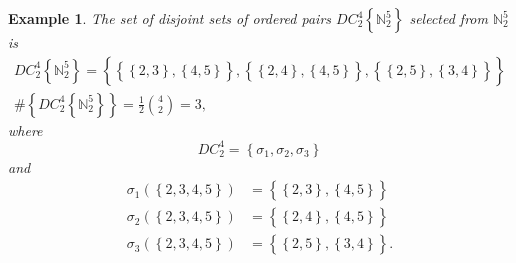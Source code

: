 \documentclass[aps,preprint]{revtex4}%
\newtheorem{example}[theorem]{Example}
\begin{document}
\begin{example}
The set of disjoint sets of ordered pairs $DC_{2}^{4}\left\{  \mathbb{N}%
_{2}^{5}\right\}  $ selected from $\mathbb{N}_{2}^{5}$ is
\begin{gather}
DC_{2}^{4}\left\{  \mathbb{N}_{2}^{5}\right\}  =\left\{  \overset{}{\left\{
\overset{}{\left\{  2,3\right\}  ,\left\{  4,5\right\}  }\right\}  ,\left\{
\overset{}{\left\{  2,4\right\}  ,\left\{  4,5\right\}  }\right\}  ,\left\{
\overset{}{\left\{  2,5\right\}  ,\left\{  3,4\right\}  }\right\}  }\right\}
\\
\#\left\{  DC_{2}^{4}\left\{  \mathbb{N}_{2}^{5}\right\}  \right\}  =\frac
{1}{2}\binom{4}{2}=3,
\end{gather}
where
\begin{equation}
DC_{2}^{4}=\left\{  \sigma_{1},\sigma_{2},\sigma_{3}\right\}
\end{equation}
and%
\begin{align}
\sigma_{1}\left(  \left\{  2,3,4,5\right\}  \right)   &  =\left\{
\overset{}{\left\{  2,3\right\}  ,\left\{  4,5\right\}  }\right\} \\
\sigma_{2}\left(  \left\{  2,3,4,5\right\}  \right)   &  =\left\{
\overset{}{\left\{  2,4\right\}  ,\left\{  4,5\right\}  }\right\} \\
\sigma_{3}\left(  \left\{  2,3,4,5\right\}  \right)   &  =\left\{
\overset{}{\left\{  2,5\right\}  ,\left\{  3,4\right\}  }\right\}  .
\end{align}

\end{example}
\end{document}
